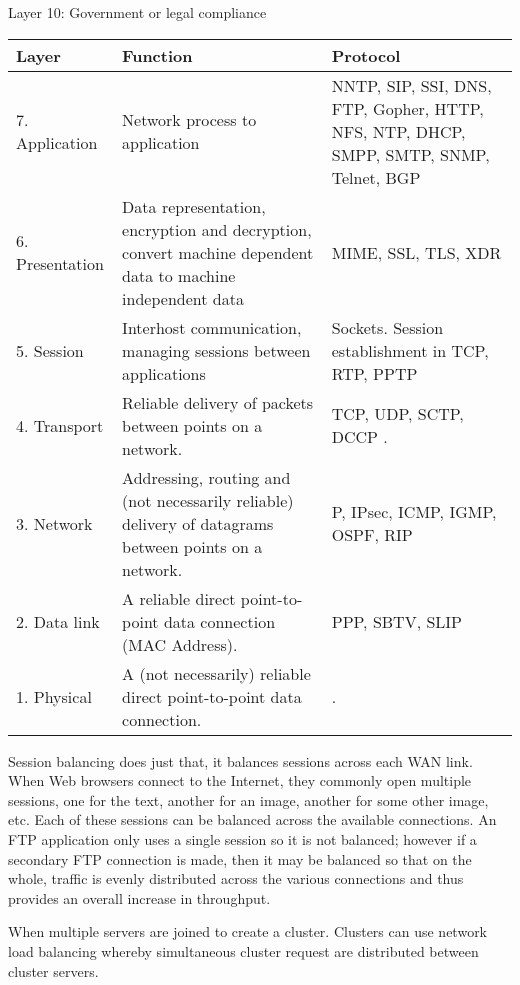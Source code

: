 \documentclass[9pt]{amsart}
\begin{document}
\begin{multicols}{2}
    Layer 10: Government or legal compliance
\begin{center}
    \begin{tabular}{| l | p{4.8cm} | p{4.5cm} | }
    \hline
    \textbf {Layer} & \textbf {Function} & \textbf {Protocol} \\ \hline
    7. Application & Network process to application & NNTP, SIP, SSI, DNS, FTP, Gopher, HTTP, NFS, NTP, DHCP, SMPP, SMTP, SNMP, Telnet, BGP \\ \hline
    6. Presentation & Data representation, encryption and decryption, convert machine dependent data to machine independent data & MIME, SSL, TLS, XDR  \\ \hline
    5. Session & Interhost communication, managing sessions between applications & Sockets. Session establishment in TCP, RTP, PPTP \\ \hline
    4. Transport & Reliable delivery of packets between points on a network. & TCP, UDP, SCTP, DCCP . \\ \hline
    3. Network & Addressing, routing and (not necessarily reliable) delivery of datagrams between points on a network. & P, IPsec, ICMP, IGMP, OSPF, RIP \\ \hline
    2. Data link & A reliable direct point-to-point data connection (MAC Address). & PPP, SBTV, SLIP  \\ \hline
    1. Physical & A (not necessarily) reliable direct point-to-point data connection. &  . \\
    \hline
    \end{tabular}
\end{center}


\noindent {\textcolor {blue} {\em Load Balancing}} 

\noindent Session balancing does just that, it balances sessions across each WAN link. When Web browsers connect to the Internet, they commonly open multiple sessions, one for the text, another for an image, another for some other image, etc. Each of these sessions can be balanced across the available connections. An FTP application only uses a single session so it is not balanced; however if a secondary FTP connection is made, then it may be balanced so that on the whole, traffic is evenly distributed across the various connections and thus provides an overall increase in throughput.

\noindent When multiple servers are joined to create a cluster. Clusters can use network load balancing whereby simultaneous cluster request are distributed between cluster servers.


\end{multicols}
\end{document}
